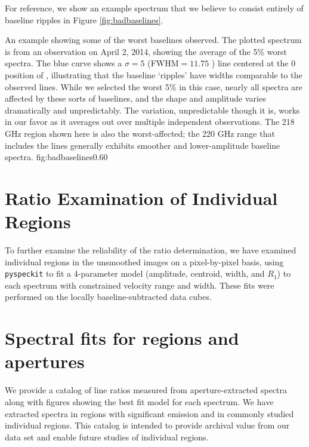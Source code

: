 For reference, we show an example spectrum that we believe to consist entirely
of baseline ripples in Figure \ref{fig:badbaselines}.

{An example showing some of the worst baselines observed.  The plotted spectrum
is from an observation on April 2, 2014, showing the average of the 5\% worst
spectra.  The blue curve shows a $\sigma=5$ \kms (FWHM$=11.75$ \kms) line centered
at the 0 \kms position of \para \threeohthree,
illustrating that the baseline `ripples' have widths comparable to the observed
lines.  While we selected the worst 5\% in this case, nearly all spectra are
affected by these sorts of baselines, and the shape and amplitude varies
dramatically and unpredictably.  The variation, unpredictable though it is,
works in our favor as it averages out over multiple independent observations.
The 218 GHz region shown here is also the worst-affected; the 220 GHz range
that includes the \thirteenco lines generally exhibits smoother and
lower-amplitude baseline spectra.}
{fig:badbaselines}{0.6}{0}


\section{Ratio Examination of Individual Regions}
To further examine the reliability of the ratio determination, we have examined
individual regions in the unsmoothed images on a pixel-by-pixel basis, using
\texttt{pyspeckit} to fit a 4-parameter model (amplitude, centroid, width, and
$R_1$) to each spectrum with constrained velocity range and width.  These fits
were performed on the locally baseline-subtracted data cubes.

\section{Spectral fits for regions and apertures}
We provide a catalog of line ratios measured from aperture-extracted spectra
along with figures showing the best fit model for each spectrum.  We have
extracted spectra in regions with significant \para emission and in commonly
studied individual regions.  This catalog is intended to provide archival value
from our data set and enable future studies of individual regions.

